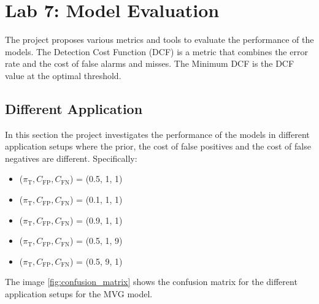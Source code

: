 \documentclass{article}
\begin{document}
\section{Lab 7: Model Evaluation}
\label{sec:model_evaluation}
The project proposes various metrics and tools to evaluate the performance of the models. The Detection Cost Function (DCF) is a metric that combines the error rate and the cost of false alarms and misses. The Minimum DCF is the DCF value at the optimal threshold. 

\subsection{Different Application}
In this section the project investigates the performance of the models in different application setups where the prior, the cost of false positives and the cost of false negatives are different. Specifically:
\begin{itemize}
    \item ($\pi_{\text{T}}, C_{\text{FP}}, C_{\text{FN}}$) = (0.5, 1, 1)
    \item ($\pi_{\text{T}}, C_{\text{FP}}, C_{\text{FN}}$) = (0.1, 1, 1)
    \item ($\pi_{\text{T}}, C_{\text{FP}}, C_{\text{FN}}$) = (0.9, 1, 1)
    \item ($\pi_{\text{T}}, C_{\text{FP}}, C_{\text{FN}}$) = (0.5, 1, 9)
    \item ($\pi_{\text{T}}, C_{\text{FP}}, C_{\text{FN}}$) = (0.5, 9, 1)
\end{itemize}
The image \ref{fig:confusion_matrix} shows the confusion matrix for the different application setups for the MVG model. 
\end{document}
